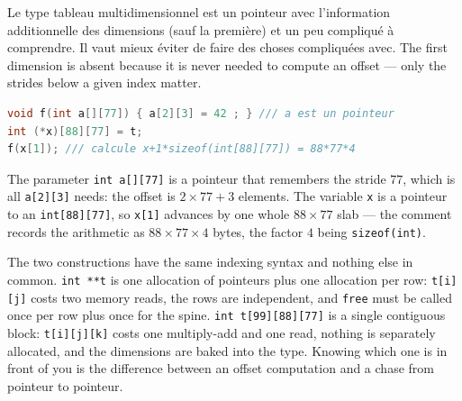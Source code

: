 \begin{remark}
  Le type tableau multidimensionnel est un pointeur avec l'information
  additionnelle des dimensions (sauf la première) et un peu compliqué
  à comprendre. Il vaut mieux éviter de faire des choses compliquées avec. The
  first dimension is absent because it is never needed to compute an offset
  --- only the strides below a given index matter.
\end{remark}

\begin{example}
  \begin{lstlisting}[language=C]
void f(int a[][77]) { a[2][3] = 42 ; } /// a est un pointeur
int (*x)[88][77] = t;
f(x[1]); /// calcule x+1*sizeof(int[88][77]) = 88*77*4
  \end{lstlisting}
  The parameter \verb|int a[][77]| is a pointeur that remembers the stride
  $77$, which is all \verb|a[2][3]| needs: the offset is $2 \times 77 + 3$
  elements. The variable \verb|x| is a pointeur to an \verb|int[88][77]|, so
  \verb|x[1]| advances by one whole $88 \times 77$ slab --- the comment records
  the arithmetic as $88 \times 77 \times 4$ bytes, the factor $4$ being
  \verb|sizeof(int)|.
\end{example}

\begin{conclusion}
  The two constructions have the same indexing syntax and nothing else in
  common. \verb|int **t| is one allocation of pointeurs plus one allocation per
  row: \verb|t[i][j]| costs two memory reads, the rows are independent, and
  \verb|free| must be called once per row plus once for the spine.
  \verb|int t[99][88][77]| is a single contiguous block: \verb|t[i][j][k]| costs
  one multiply-add and one read, nothing is separately allocated, and the
  dimensions are baked into the type. Knowing which one is in front of you is
  the difference between an offset computation and a chase from pointeur to
  pointeur.
\end{conclusion}
